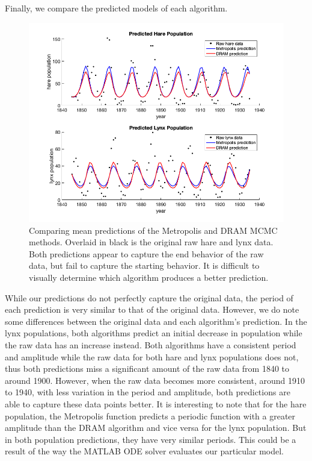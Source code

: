 \documentclass{article}
\begin{document}
\par Finally, we compare the predicted models of each algorithm.
\begin{figure}[H]
    \centering
    \includegraphics[width=15cm]{MCMC_figs/dram_mh_meanpredComp.png}
    \caption{Comparing mean predictions of the Metropolis and DRAM MCMC methods. Overlaid in black is the original raw hare and lynx data. Both predictions appear to capture the end behavior of the raw data, but fail to capture the starting behavior. It is difficult to visually determine which algorithm produces a better prediction.}
    \label{fig:13mcmc}
\end{figure}
While our predictions do not perfectly capture the original data, the period of each prediction is very similar to that of the original data. However, we do note some differences between the original data and each algorithm's prediction. In the lynx populations, both algorithms predict an initial decrease in population while the raw data has an increase instead. Both algorithms have a consistent period and amplitude while the raw data for both hare and lynx populations does not, thus both predictions miss a significant amount of the raw data from 1840 to around 1900. However, when the raw data becomes more consistent, around 1910 to 1940, with less variation in the period and amplitude, both predictions are able to capture these data points better. It is interesting to note that for the hare population, the Metropolis function predicts a periodic function with a greater amplitude than the DRAM algorithm and vice versa for the lynx population. But in both population predictions, they have very similar periods. This could be a result of the way the MATLAB ODE solver evaluates our particular model.
\end{document}
